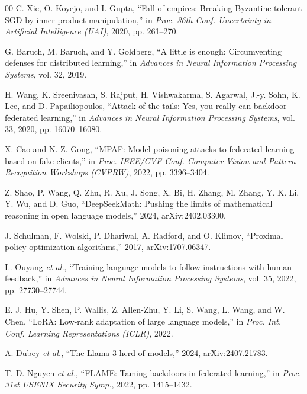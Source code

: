 \documentclass[conference,9pt]{IEEEtran}
\begin{document}
\begin{thebibliography}{00}
C. Xie, O. Koyejo, and I. Gupta, ``Fall of empires: Breaking Byzantine-tolerant SGD by inner product manipulation,'' in \emph{Proc. 36th Conf. Uncertainty in Artificial Intelligence (UAI)}, 2020, pp. 261--270.

G. Baruch, M. Baruch, and Y. Goldberg, ``A little is enough: Circumventing defenses for distributed learning,'' in \emph{Advances in Neural Information Processing Systems}, vol. 32, 2019.

H. Wang, K. Sreenivasan, S. Rajput, H. Vishwakarma, S. Agarwal, J.-y. Sohn, K. Lee, and D. Papailiopoulos, ``Attack of the tails: Yes, you really can backdoor federated learning,'' in \emph{Advances in Neural Information Processing Systems}, vol. 33, 2020, pp. 16070--16080.

X. Cao and N. Z. Gong, ``MPAF: Model poisoning attacks to federated learning based on fake clients,'' in \emph{Proc. IEEE/CVF Conf. Computer Vision and Pattern Recognition Workshops (CVPRW)}, 2022, pp. 3396--3404.

Z. Shao, P. Wang, Q. Zhu, R. Xu, J. Song, X. Bi, H. Zhang, M. Zhang, Y. K. Li, Y. Wu, and D. Guo, ``DeepSeekMath: Pushing the limits of mathematical reasoning in open language models,'' 2024, arXiv:2402.03300.

J. Schulman, F. Wolski, P. Dhariwal, A. Radford, and O. Klimov, ``Proximal policy optimization algorithms,'' 2017, arXiv:1707.06347.

L. Ouyang \emph{et al.}, ``Training language models to follow instructions with human feedback,'' in \emph{Advances in Neural Information Processing Systems}, vol. 35, 2022, pp. 27730--27744.

E. J. Hu, Y. Shen, P. Wallis, Z. Allen-Zhu, Y. Li, S. Wang, L. Wang, and W. Chen, ``LoRA: Low-rank adaptation of large language models,'' in \emph{Proc. Int. Conf. Learning Representations (ICLR)}, 2022.

A. Dubey \emph{et al.}, ``The Llama 3 herd of models,'' 2024, arXiv:2407.21783.

T. D. Nguyen \emph{et al.}, ``FLAME: Taming backdoors in federated learning,'' in \emph{Proc. 31st USENIX Security Symp.}, 2022, pp. 1415--1432.

\end{thebibliography}
\end{document}
